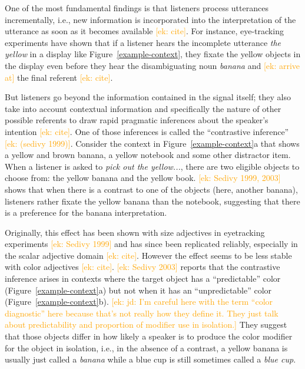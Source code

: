 \documentclass[10pt,letterpaper]{article}
\newcommand{\ek}[1]{\textcolor{Orange}{[ek: #1]}}
\newcommand{\jd}[1]{\textcolor{Purple}{[jd: #1]}}
\begin{document}
One of the most fundamental findings is that listeners process utterances incrementally, i.e., new information is incorporated into the interpretation of the utterance as soon as it becomes available \ek{cite}. For instance, eye-tracking experiments have shown that if a listener hears the incomplete utterance \textit{the yellow} in a display like Figure~\ref{example-context}, they fixate the yellow objects in the display even before they hear the disambiguating noun \textit{banana} and \ek{arrive at} the final referent \ek{cite}.

But listeners go beyond the information contained in the signal itself; they also take into account contextual information and specifically the nature of other possible referents to draw rapid pragmatic inferences about the speaker's intention \ek{cite}. One of those inferences is called the ``contrastive inference'' \ek{(sedivy 1999)}. Consider the context in Figure~\ref{example-context}a that shows a yellow and brown banana, a yellow notebook and some other distractor item. When a listener is asked to \textit{pick out the yellow...}, there are two eligible objects to choose from: the yellow banana and the yellow book. \ek{Sedivy 1999, 2003} shows that when there is a contrast to one of the objects (here, another banana), listeners rather fixate the yellow banana than the notebook, suggesting that there is a preference for the banana interpretation. 

Originally, this effect has been shown with size adjectives in eyetracking experiments \ek{Sedivy 1999} and has since been replicated reliably, especially in the scalar adjective domain \ek{cite}. However the effect seems to be less stable with color adjectives \ek{cite}. \ek{Sedivy 2003} reports that the contrastive inference arises in contexts where the target object has a ``predictable'' color (Figure~\ref{example-context}a) but not when it has an ``unpredictable'' color (Figure~\ref{example-context}b). 
\ek{jd: I'm careful here with the term ``color diagnostic'' here because that's not really how they define it. They just talk about predictability and proportion of modifier use in isolation.} 
They suggest that those objects differ in how likely a speaker is to produce the color modifier for the object in isolation, i.e., in the absence of a contrast, a yellow banana is usually just called a \textit{banana} while a blue cup is still sometimes called a \textit{blue cup}.

\end{document}
